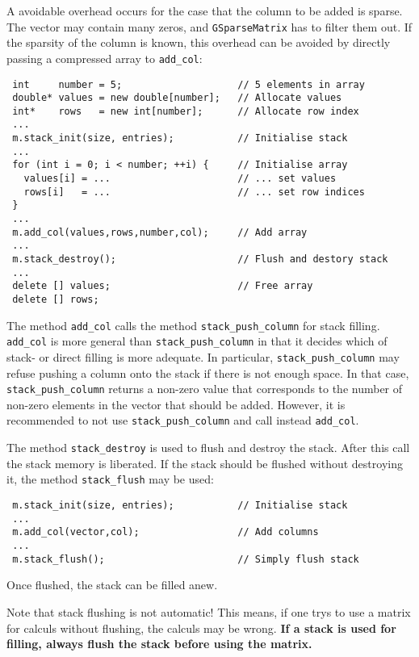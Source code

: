\documentclass{article}[12pt,a4]
\begin{document}
A avoidable overhead occurs for the case that the column to be added 
is sparse.
The vector may contain many zeros, and {\tt GSparseMatrix} has to 
filter them out.
If the sparsity of the column is known, this overhead can be avoided 
by directly passing a compressed array to {\tt add\_col}:
\begin{verbatim}
 int     number = 5;                    // 5 elements in array
 double* values = new double[number];   // Allocate values
 int*    rows   = new int[number];      // Allocate row index
 ...
 m.stack_init(size, entries);           // Initialise stack
 ...
 for (int i = 0; i < number; ++i) {     // Initialise array
   values[i] = ...                      // ... set values
   rows[i]   = ...                      // ... set row indices
 }
 ...
 m.add_col(values,rows,number,col);     // Add array
 ...
 m.stack_destroy();                     // Flush and destory stack
 ...
 delete [] values;                      // Free array
 delete [] rows;
\end{verbatim}

The method {\tt add\_col} calls the method {\tt stack\_push\_column}
for stack filling.
{\tt add\_col} is more general than {\tt stack\_push\_column} in that 
it decides which of stack- or direct filling is more adequate.
In particular, {\tt stack\_push\_column} may refuse pushing a column 
onto the stack if there is not enough space.
In that case, {\tt stack\_push\_column} returns a non-zero value that 
corresponds to the number of non-zero elements in the vector that 
should be added.
However, it is recommended to not use {\tt stack\_push\_column} and 
call instead {\tt add\_col}.

The method {\tt stack\_destroy} is used to flush and destroy the
stack. 
After this call the stack memory is liberated.
If the stack should be flushed without destroying it, the method
{\tt stack\_flush} may be used:
\begin{verbatim}
 m.stack_init(size, entries);           // Initialise stack
 ...
 m.add_col(vector,col);                 // Add columns
 ...
 m.stack_flush();                       // Simply flush stack
\end{verbatim}
Once flushed, the stack can be filled anew.

Note that stack flushing is not automatic!
This means, if one trys to use a matrix for calculs without flushing, 
the calculs may be wrong.
{\bf If a stack is used for filling, always flush the stack before using 
the matrix.}


\clearpage
\end{document}
